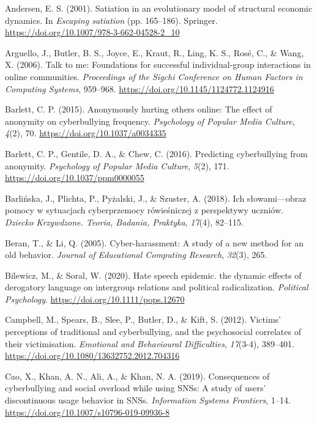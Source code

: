 \documentclass[10pt,dvipsnames]{scrartcl}
\begin{document}
\hypertarget{ref-andersen2001satiation}{}
Andersen, E. S. (2001). Satiation in an evolutionary model of structural
economic dynamics. In \emph{Escaping satiation} (pp. 165--186).
Springer. \url{https://doi.org/10.1007/978-3-662-04528-2_10}

\hypertarget{ref-arguello2006talk}{}
Arguello, J., Butler, B. S., Joyce, E., Kraut, R., Ling, K. S., Rosé,
C., \& Wang, X. (2006). Talk to me: Foundations for successful
individual-group interactions in online communities. \emph{Proceedings
of the Sigchi Conference on Human Factors in Computing Systems},
959--968. \url{https://doi.org/10.1145/1124772.1124916}

\hypertarget{ref-barlett2015anonymously}{}
Barlett, C. P. (2015). Anonymously hurting others online: The effect of
anonymity on cyberbullying frequency. \emph{Psychology of Popular Media
Culture}, \emph{4}(2), 70. \url{https://doi.org/10.1037/a0034335}

\hypertarget{ref-barlett2016predicting}{}
Barlett, C. P., Gentile, D. A., \& Chew, C. (2016). Predicting
cyberbullying from anonymity. \emph{Psychology of Popular Media
Culture}, \emph{5}(2), 171. \url{https://doi.org/10.1037/ppm0000055}

\hypertarget{ref-barlinska2018slowami}{}
Barlińska, J., Plichta, P., Pyżalski, J., \& Szuster, A. (2018). Ich
słowami---obraz pomocy w sytuacjach cyberprzemocy rówieśniczej z
perspektywy uczniów. \emph{Dziecko Krzywdzone. Teoria, Badania,
Praktyka}, \emph{17}(4), 82--115.

\hypertarget{ref-beran2005cyber}{}
Beran, T., \& Li, Q. (2005). Cyber-harassment: A study of a new method
for an old behavior. \emph{Journal of Educational Computing Research},
\emph{32}(3), 265.

\hypertarget{ref-bilewicz2020hate}{}
Bilewicz, M., \& Soral, W. (2020). Hate speech epidemic. the dynamic
effects of derogatory language on intergroup relations and political
radicalization. \emph{Political Psychology}.
\url{https://doi.org/10.1111/pops.12670}

\hypertarget{ref-campbell2012victims}{}
Campbell, M., Spears, B., Slee, P., Butler, D., \& Kift, S. (2012).
Victims' perceptions of traditional and cyberbullying, and the
psychosocial correlates of their victimisation. \emph{Emotional and
Behavioural Difficulties}, \emph{17}(3-4), 389--401.
\url{https://doi.org/10.1080/13632752.2012.704316}

\hypertarget{ref-cao2019consequences}{}
Cao, X., Khan, A. N., Ali, A., \& Khan, N. A. (2019). Consequences of
cyberbullying and social overload while using SNSs: A study of users'
discontinuous usage behavior in SNSs. \emph{Information Systems
Frontiers}, 1--14. \url{https://doi.org/10.1007/s10796-019-09936-8}
\end{document}
